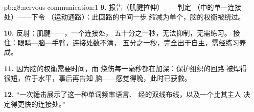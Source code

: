 \begin{solution}{pb:g8:nervous-communication:1}
\textbf{9.} 报告（肌腱拉伸）——判定
（中的单一连接处）——下令
（运动通路）：此回路的中间一步
缩减为单个，脑的权衡被绕过。

\textbf{10.} 反射：肌腱——，一个连接处，
五十分之一秒，无法抑制，无需练习。
接住：眼睛—脑—手臂，连接处数不清，
五分之一秒，完全出于自主，需经练习养成。

\textbf{11.} 因为脑的权衡需要时间，而
烧伤每一毫秒都在加深：保护组织的回路
被焊得很短，位于水平，事后再告知
脑——感觉得晚，此时已获救。

\textbf{12.} “一次锤击展示了这一种单词频率语言、
经的双线布线，以及一个比其主人
决定得更快的连接处。”
\end{solution}
